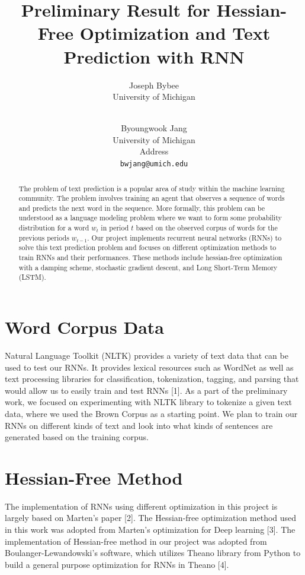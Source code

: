 \documentclass{article} %
\title{Preliminary Result for Hessian-Free Optimization and Text Prediction with RNN}
\author{
Joseph Bybee\\
University of Michigan\\
\texttt{} \\
\and
Byoungwook Jang\\
University of Michigan \\
Address \\
\texttt{bwjang@umich.edu} \\
}
\begin{document}
\maketitle

\begin{abstract}
The problem of text prediction is a popular area of study within the machine learning community. The problem involves training an agent that observes a sequence of words and predicts the next word in the sequence. More formally, this problem can be understood as a language modeling problem where we want to form some probability distribution for a word $w_t$ in period $t$ based on the observed corpus of words for the previous periods $w_{t-1}$. Our project implements recurrent neural networks (RNNs) to solve this text prediction problem and focuses on different optimization methods to train RNNs and their performances. These methods include hessian-free optimization with a damping scheme, stochastic gradient descent, and Long Short-Term Memory (LSTM).
\end{abstract}

\section{Word Corpus Data}
Natural Language Toolkit (NLTK) provides a variety of text data that can be used to test our RNNs. It provides lexical resources such as WordNet as well as text processing libraries for classification, tokenization, tagging, and parsing that would allow us to easily train and test RNNs [1]. As a part of the preliminary work, we focused on experimenting with NLTK library to tokenize a given text data, where we used the Brown Corpus as a starting point.  We plan to train our RNNs on different kinds of text and look into what kinds of sentences are generated based on the training corpus.

\section{Hessian-Free Method}
The implementation of RNNs using different optimization in this project is largely based on Marten's paper [2]. The Hessian-free optimization method used in this work was adopted from Marten's optimization for Deep learning [3]. The implementation of Hessian-free method in our project was adopted from Boulanger-Lewandowski's software, which utilizes Theano library from Python to build a general purpose optimization for RNNs in Theano [4]. 
\end{document}
